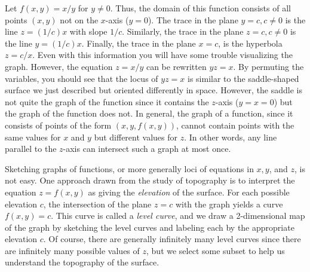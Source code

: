 \begin{example}
	 Let $f(x,y) = x/y$ for $y \not= 0$.  Thus, the domain of this
	function consists of all points $(x,y)$ not on the $x$-axis
	($y = 0$).
	The trace in the plane $y = c, c \not= 0$ is the line $z = (1/c)x$
	with slope $1/c$.   Similarly, the trace in the plane $z = c, c \not=0$
	is the line $y = (1/c)x$.  Finally, the trace in the plane $x = c$,
	is the hyperbola $z = c/x$.  Even with this information you will have
	some trouble visualizing the graph.   However, the equation
	$z = x/y$ can be rewritten $yz = x$.   By permuting the variables,
	you should see that the locus of $yz = x$
	 is similar to the  saddle-shaped surface
	we just described but oriented differently in space.  However,
	 the saddle
	is not quite the graph of the function since it  contains the 
	 $z$-axis ($y = x = 0$) but the graph of the function does not.
	In general, the graph of a function, since it consists of points
	of the form $(x,y,f(x,y))$, cannot contain points with the same
	values for $x$ and $y$ but different values for $z$.  In other words,
	any line parallel to the $z$-axis can intersect such a graph at most
	once. 
\end{example}

Sketching graphs of functions, or more generally loci of equations
in $x, y$, and $z$, is not easy.   One approach drawn from the
study of topography is to interpret the equation $z = f(x,y)$ as
giving the \emph{elevation} of the surface. 
For each possible elevation $c$,
 the intersection of the plane $z = c$ with the graph
yields a curve $f(x,y) = c$.  This curve is called a \emph{level curve}, 
and we draw a 2-dimensional map of the graph by sketching
the level curves and labeling each by the appropriate elevation
$c$.  Of course, there are generally infinitely many level curves
since there are infinitely many possible values of $z$, but we
select some subset to help us understand the topography of the
surface.

